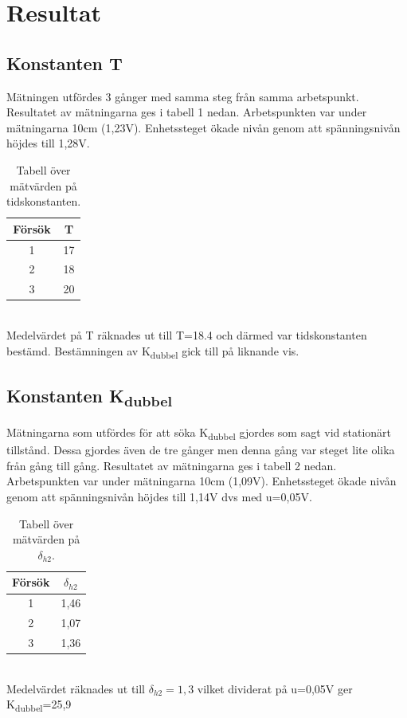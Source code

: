 \documentclass[a4wide]{article}
\begin{document}

\section{Resultat}


\subsection{Konstanten T}
Mätningen utfördes 3 gånger med samma steg från samma arbetspunkt. Resultatet av mätningarna ges i tabell 1 nedan. Arbetspunkten var under mätningarna 10cm (1,23V). Enhetssteget ökade nivån genom att spänningsnivån höjdes till 1,28V. 

\begin{table}[ht] 
\centering 
\begin{tabular}{c c} 
Försök & T \\ [0.5ex] %
\hline
1 & 17 \\
2 & 18 \\
3 & 20 \\

\end{tabular} 
\caption{Tabell över mätvärden på tidskonstanten.}

\end{table}
~\\ %
Medelvärdet på T räknades ut till T=18.4 och därmed var tidskonstanten bestämd. 
Bestämningen av K\textsubscript{dubbel} gick till på liknande vis. 


\subsection{Konstanten K\textsubscript{dubbel}}

Mätningarna som utfördes för att söka K\textsubscript{dubbel} gjordes som sagt vid stationärt tillstånd. Dessa gjordes även de tre gånger men denna gång var steget lite olika från gång till gång. Resultatet av mätningarna ges i tabell 2 nedan. Arbetspunkten var under mätningarna 10cm (1,09V). Enhetssteget ökade nivån genom att spänningsnivån höjdes till 1,14V dvs med u=0,05V. 

\begin{table}[ht] 
\centering 
\begin{tabular}{c c} 
Försök & $\delta_{h2}$ \\ [0.5ex] %
\hline
1 & 1,46 \\
2 & 1,07 \\
3 & 1,36 \\

\end{tabular} 
\caption{Tabell över mätvärden på $\delta_{h2}$.}
\end{table}
~\\ %
Medelvärdet räknades ut till $\delta_{h2}=1,3$ vilket dividerat på u=0,05V ger K\textsubscript{dubbel}=25,9
\newpage
\end{document}
